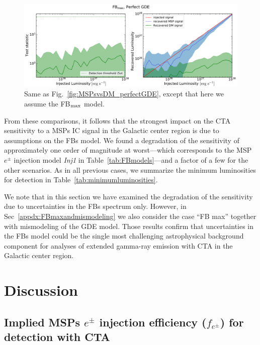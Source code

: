 \documentclass[doublespace,nopageskip]{VTthesis} %
\begin{document}
\begin{figure}[htb]
    \begin{center}
    \includegraphics[width=\textwidth]{Figures/CTA/TS-dm-mis-False-Fermi-min-False.pdf}
\caption{Same as Fig.~\ref{fig:MSPsvsDM_perfectGDE}, except that here we assume the FB$_{\rm max}$ model.}\label{fig:MSPsvsDM_perfectGDEFBmax}
    \end{center}
\end{figure}

From these comparisons, it follows that the strongest impact on the CTA sensitivity to a MSPs IC signal in the Galactic center region is due to assumptions on the FBs model. We found a degradation of the sensitivity of approximately one order of magnitude at worst---which corresponds to the MSP $e^\pm$ injection model \textit{Inj1} in Table~\ref{tab:FBmodels}---and a factor of a few for the other scenarios. As in all previous cases, we summarize the minimum luminosities for detection in Table~\ref{tab:minimumluminosities}.  

We note that in this section we have examined the degradation of the sensitivity due to uncertainties in the FBs spectrum only. However, in Sec~\ref{appdx:FBmaxandmismodeling} we also consider the case ``FB max'' together with  mismodeling of the GDE model. Those results confirm that uncertainties in the FBs model could be the single most challenging astrophysical background component for analyses of extended gamma-ray emission with CTA in the Galactic center region.     

\section{Discussion}
\label{sec:discussions_CTA}

\subsection{Implied MSPs $e^\pm$ injection efficiency ($f_{e^\pm}$) for detection with CTA}
\label{sec:efficiency}
\end{document}
